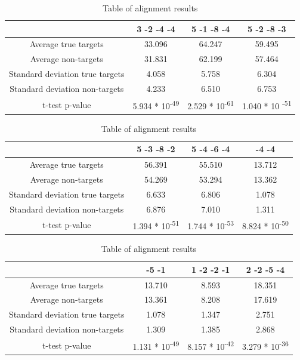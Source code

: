 \documentclass[11pt, a4paper, oneside]{book}
\begin{document}
\begin{table}
\centering
\footnotesize
\caption{Table of alignment results}
\vspace{0.3cm}
{\setlength{\extrarowheight}{5pt}
\begin{tabular}{c|c|c|c}
& 3 -2 -4 -4 & 5 -1 -8 -4 & 5 -2 -8 -3 \\
\hline\hline
Average true targets & 33.096 & 64.247 & 59.495	\\
Average	non-targets & 31.831 & 62.199 & 57.464 \\
\hline
Standard deviation true targets & 4.058	& 5.758 & 6.304\\
Standard deviation non-targets & 4.233 & 6.510 & 6.753 \\
\hline
t-test p-value & 5.934 * 10\textsuperscript{-49} & 2.529 * 10\textsuperscript{-61} & 1.040 * 10 \textsuperscript{-51} \\\hline
\end{tabular}}\vspace{0.5cm}

{\setlength{\extrarowheight}{5pt}
\begin{tabular}{c|c|c|c}
& 5 -3 -8 -2 & 5 -4 -6 -4 & -4 -4 \\
\hline\hline
Average true targets & 56.391 & 55.510 & 13.712 \\
Average	non-targets & 54.269 & 53.294 & 13.362\\
\hline
Standard deviation true targets & 6.633 & 6.806 & 1.078\\
Standard deviation non-targets & 6.876 & 7.010 & 1.311\\
\hline
t-test p-value & 1.394 * 10\textsuperscript{-51} & 1.744 * 10\textsuperscript{-53} & 8.824 * 10\textsuperscript{-50} \\\hline
\end{tabular}}\vspace{0.5cm}


{\setlength{\extrarowheight}{5pt}
\begin{tabular}{c|c|c|c}
 & -5 -1 & 1 -2 -2 -1 & 2 -2 -5 -4  \\
\hline\hline
Average true targets & 13.710 & 8.593 & 18.351\\
Average	non-targets  & 13.361 &	8.208 &	17.619 \\
\hline
Standard deviation true targets & 1.078	& 1.347	& 2.751\\
Standard deviation non-targets & 1.309 & 1.385 & 2.868\\ 
\hline 
t-test p-value & 1.131 * 10\textsuperscript{-49} & 8.157 * 10\textsuperscript{-42} & 3.279 * 10\textsuperscript{-36} \\
\hline
\end{tabular}}
\label{table:results}
\end{table}
\end{document}
